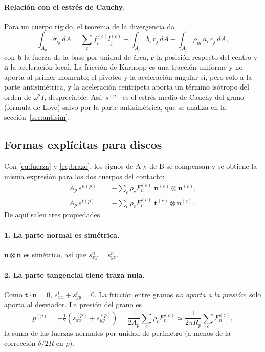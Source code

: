 \documentclass[11pt,a4paper]{article}
\newcommand{\vect}[1]{\mathbf{#1}}
\newcommand{\n}{\vect{n}}
\newcommand{\tv}{\vect{t}}
\begin{document}
\paragraph{Relación con el estrés de Cauchy.} Para un cuerpo rígido, el
teorema de la divergencia da
\begin{equation}
  \int_{A_p} \sigma_{ij} \, dA
  = \sum_c f^{(c)}_i l^{(c)}_j
  + \int_{A_p} b_i \, r_j \, dA
  - \int_{A_p} \rho_m \, a_i \, r_j \, dA ,
\end{equation}
con $\vect{b}$ la fuerza de la base por unidad de área, $\vect{r}$ la
posición respecto del centro y $\vect{a}$ la aceleración local. La
fricción de Karnopp es una tracción uniforme y no aporta al primer
momento; el pivoteo y la aceleración angular sí, pero solo a la parte
antisimétrica, y la aceleración centrípeta aporta un término isótropo del
orden de $\omega^2 I$, despreciable. Así, $s^{(p)}$ es el estrés medio de
Cauchy del grano (fórmula de Love) salvo por la parte antisimétrica, que
se analiza en la sección~\ref{sec:antisim}.

\subsection{Formas explícitas para discos}
\label{sec:propiedades}

Con \eqref{eq:fuerza} y \eqref{eq:brazo}, los signos de A y de B se
compensan y se obtiene la misma expresión para los dos cuerpos del
contacto:
\begin{align}
  A_p \, s^{n(p)} &= -\sum_c \rho_c F^{(c)}_n \; \n^{(c)} \otimes \n^{(c)} ,
  \label{eq:sn} \\
  A_p \, s^{t(p)} &= -\sum_c \rho_c F^{(c)}_t \; \tv^{(c)} \otimes \n^{(c)} .
  \label{eq:st}
\end{align}
De aquí salen tres propiedades.

\paragraph{1. La parte normal es simétrica.} $\n \otimes \n$ es simétrico,
así que $s^n_{xy} = s^n_{yx}$.

\paragraph{2. La parte tangencial tiene traza nula.} Como $\tv \cdot \n =
0$, $s^t_{xx} + s^t_{yy} = 0$. La fricción entre granos \emph{no aporta a
la presión}; solo aporta al desviador. La presión del grano es
\begin{equation}
  p^{(p)} = -\tfrac{1}{2}\left(s^{(p)}_{xx} + s^{(p)}_{yy}\right)
  = \frac{1}{2 A_p} \sum_c \rho_c F^{(c)}_n
  \simeq \frac{1}{2 \pi R_p} \sum_c F^{(c)}_n ,
\end{equation}
la suma de las fuerzas normales por unidad de perímetro (a menos de la
corrección $\delta / 2R$ en $\rho$).
\end{document}

